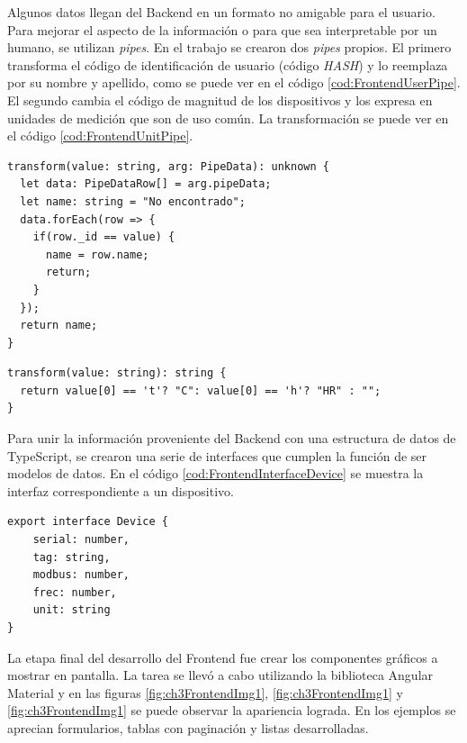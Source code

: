 Algunos datos llegan del Backend en un formato no amigable para el usuario. Para mejorar el aspecto de la información o para que sea interpretable por un humano, se utilizan \emph{pipes}.
En el trabajo se crearon dos \emph{pipes} propios. 
El primero transforma el código de identificación de usuario (código \emph{HASH}) y lo reemplaza por su nombre y apellido, como se puede ver en el código \ref{cod:FrontendUserPipe}.
El segundo cambia el código de magnitud de los dispositivos y los expresa en unidades de medición que son de uso común. La transformación se puede ver en el código \ref{cod:FrontendUnitPipe}.

\begin{lstlisting}[label=cod:FrontendUserPipe,caption=Función de pipe de usuario]
transform(value: string, arg: PipeData): unknown {
  let data: PipeDataRow[] = arg.pipeData;
  let name: string = "No encontrado";
  data.forEach(row => {
    if(row._id == value) {
      name = row.name;
      return;
    }
  });
  return name;
}
\end{lstlisting}

\begin{lstlisting}[label=cod:FrontendUnitPipe,caption=Función de pipe de unidad]
transform(value: string): string {
  return value[0] == 't'? "C": value[0] == 'h'? "HR" : "";
}
\end{lstlisting}

Para unir la información proveniente del Backend con una estructura de datos de TypeScript, se crearon una serie de interfaces que cumplen la función de ser modelos de datos.
En el código \ref{cod:FrontendInterfaceDevice} se muestra la interfaz correspondiente a un dispositivo.

\newpage

\begin{lstlisting}[label=cod:FrontendInterfaceDevice,caption=Modelo de datos de dispositivo]
export interface Device {
    serial: number,
    tag: string,
    modbus: number,
    frec: number,
    unit: string
}
\end{lstlisting}

La etapa final del desarrollo del Frontend fue crear los componentes gráficos a mostrar en pantalla.
La tarea se llevó a cabo utilizando la biblioteca Angular Material y en las figuras \ref{fig:ch3FrontendImg1}, \ref{fig:ch3FrontendImg1} y \ref{fig:ch3FrontendImg1} se puede observar la apariencia lograda.
En los ejemplos se aprecian formularios, tablas con paginación y listas desarrolladas. 

